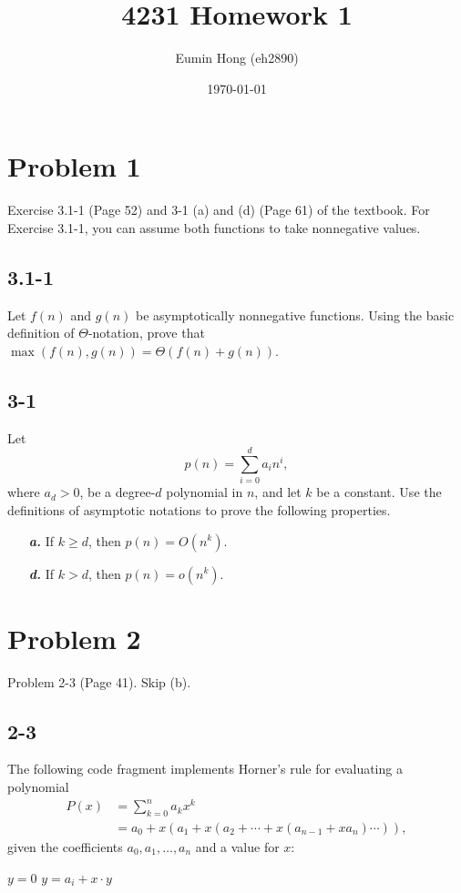 \documentclass{../homework}
\title{4231 Homework 1}
\author{Eumin Hong (eh2890)}
\date{\today}
\begin{document}
\maketitle



\section*{Problem 1}
\begin{tcolorbox}
    Exercise 3.1-1 (Page 52) and 3-1 (a) and (d) (Page 61) of the textbook. For Exercise 3.1-1, you can assume both functions to take nonnegative values.
\end{tcolorbox}

\subsection*{3.1-1}
Let $f(n)$ and $g(n)$ be asymptotically nonnegative functions. Using the basic definition of $\Theta $-notation, prove that $\max{ \left(f(n), g(n)\right)} = \Theta \left(f(n) + g(n)\right)$.

\subsection*{3-1}
Let
$$p(n) = \sum_{i=0}^{d} a_in^i,$$
where $a_d > 0$, be a degree-$d$ polynomial in $n$, and let $k$ be a constant. Use the definitions of asymptotic notations to prove the following properties.
\begin{itemize}
    \item[\textbf{\textit{a.}}] If $k \geq d$, then $p(n) = O\left(n^k\right)$.
    \item[\textbf{\textit{d.}}] If $k > d$, then $p(n) = o\left(n^k\right)$.
\end{itemize}

\newpage
\section*{Problem 2}
\begin{tcolorbox}
    Problem 2-3 (Page 41). Skip (b).
\end{tcolorbox}

\subsection*{2-3}
The following code fragment implements Horner’s rule for evaluating a polynomial
\begin{align*}
    P(x) &= \sum_{k=0}^{n} a_kx^k\\
    &= a_0 + x(a_1 + x(a_2 + \cdots + x(a_{n-1} + xa_n) \cdots )),
\end{align*}
given the coefficients $a_0, a_1, \dots, a_n$ and a value for $x$:
\begin{algorithmic}[1]
\State $y = 0$
    \State $y = a_i + x\cdot y$
\ENDFOR
\end{algorithmic}
\end{document}
